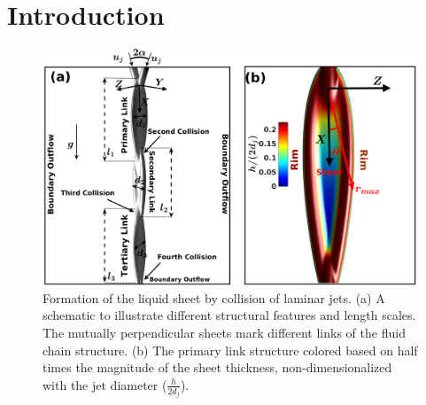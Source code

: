 \documentclass[%
aip,
sd,%
amsmath,amssymb,
preprint,%
author-year,%
]{revtex4-1}
\begin{document}
\section{Introduction}\label{Sec::Introduction}
\begin{figure}[H]
	\centering
	\includegraphics[width=\linewidth]{schematic}
	\caption{Formation of the liquid sheet by collision of laminar jets. (a) A schematic to illustrate different structural features and length scales. The mutually perpendicular sheets mark different links of the fluid chain structure. (b) The primary link structure colored based on half times the magnitude of the sheet thickness, non-dimensionalized with the jet diameter ($\frac{h}{2d_j}$).}
	\label{Figure::schematic}
\end{figure}
\end{document}
